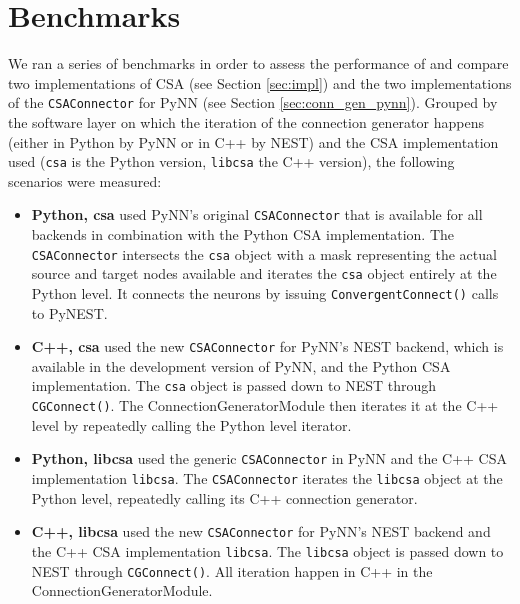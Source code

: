 \documentclass{frontiersSCNS} %
\begin{document}
\section{Benchmarks}\label{sec:benchmarks}

We ran a series of benchmarks in order to assess the performance of
and compare two implementations of CSA (see Section \ref{sec:impl})
and the two implementations of the \verb|CSAConnector| for PyNN (see Section
\ref{sec:conn_gen_pynn}). Grouped by the software layer on which the
iteration of the connection generator happens (either in Python by PyNN
or in C++ by NEST) and the CSA implementation used (\verb|csa| is the Python
version, \verb|libcsa| the C++ version), the following scenarios were
measured:

\begin{itemize}
\item \textbf{Python, csa} used PyNN's original \verb|CSAConnector|
  that is available for all backends in combination with the Python
  CSA implementation. The \verb|CSAConnector| intersects the
  \verb|csa| object with a mask representing the actual source and
  target nodes available and iterates the \verb|csa| object entirely
  at the Python level. It connects the neurons by issuing
  \verb|ConvergentConnect()| calls to PyNEST.
\item \textbf{C++, csa} used the new \verb|CSAConnector| for PyNN's NEST
  backend, which is available in the development version of PyNN, and the
  Python CSA implementation. The \verb|csa| object is passed down to NEST
  through \verb|CGConnect()|. The ConnectionGeneratorModule then
  iterates it at the C++ level by repeatedly calling the Python level
  iterator.
\item \textbf{Python, libcsa} used the generic \verb|CSAConnector| in
  PyNN and the C++ CSA implementation \verb|libcsa|. The
  \verb|CSAConnector| iterates the \verb|libcsa| object at the Python
  level, repeatedly calling its C++ connection generator.
\item \textbf{C++, libcsa} used the new \verb|CSAConnector| for PyNN's
  NEST backend and the C++ CSA implementation \verb|libcsa|. The
  \verb|libcsa| object is passed down to NEST through
  \verb|CGConnect()|. All iteration happen in C++ in the
  ConnectionGeneratorModule.
\end{itemize}
\end{document}
